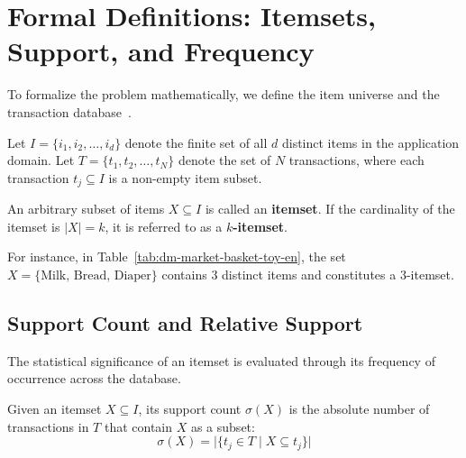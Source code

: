 \section{Formal Definitions: Itemsets, Support, and Frequency}
\label{sec:dm-formal-definitions}

To formalize the problem mathematically, we define the item universe and the transaction database~\cite{tan2018, agrawal1994}.

\begin{definition}
Let $I = \{i_1, i_2, \dots, i_d\}$ denote the finite set of all $d$ distinct items in the application domain. Let $T = \{t_1, t_2, \dots, t_N\}$ denote the set of $N$ transactions, where each transaction $t_j \subseteq I$ is a non-empty item subset.
\end{definition}

\begin{definition}[$k$-Itemset]
An arbitrary subset of items $X \subseteq I$ is called an \textbf{itemset}. If the cardinality of the itemset is $|X| = k$, it is referred to as a \textbf{$k$-itemset}.
\end{definition}

For instance, in Table~\ref{tab:dm-market-basket-toy-en}, the set $X = \{\text{Milk, Bread, Diaper}\}$ contains 3 distinct items and constitutes a $3$-itemset.

\subsection{Support Count and Relative Support}
The statistical significance of an itemset is evaluated through its frequency of occurrence across the database.

\begin{definition}
Given an itemset $X \subseteq I$, its support count $\sigma(X)$ is the absolute number of transactions in $T$ that contain $X$ as a subset:
\begin{equation}
\label{eq:dm-support-count-en}
\sigma(X) = \big| \{ t_j \in T \mid X \subseteq t_j \} \big|
\end{equation}
\end{definition}

